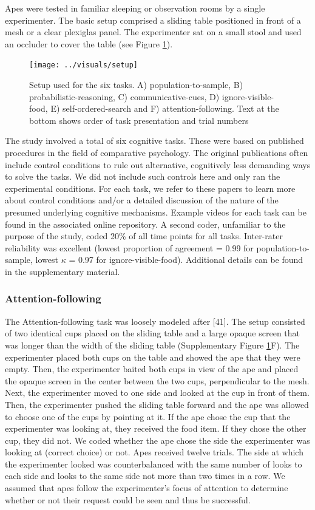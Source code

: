\documentclass[
  man,floatsintext]{apa6}
\begin{document}
Apes were tested in familiar sleeping or observation rooms by a single experimenter. The basic setup comprised a sliding table positioned in front of a mesh or a clear plexiglas panel. The experimenter sat on a small stool and used an occluder to cover the table (see Figure \ref{fig:setup}).

\begin{figure}
\texttt{[image: ../visuals/setup]} \caption{Setup used for the six tasks. A) population-to-sample, B) probabilistic-reasoning, C) communicative-cues, D) ignore-visible-food, E) self-ordered-search and F) attention-following. Text at the bottom shows order of task presentation and trial numbers}\label{fig:setup}
\end{figure}

The study involved a total of six cognitive tasks. These were based on published procedures in the field of comparative psychology. The original publications often include control conditions to rule out alternative, cognitively less demanding ways to solve the tasks. We did not include such controls here and only ran the experimental conditions. For each task, we refer to these papers to learn more about control conditions and/or a detailed discussion of the nature of the presumed underlying cognitive mechanisms. Example videos for each task can be found in the associated online repository. A second coder, unfamiliar to the purpose of the study, coded 20\% of all time points for all tasks. Inter-rater reliability was excellent (lowest proportion of agreement = 0.99 for population-to-sample, lowest \(\kappa\) = 0.97 for ignore-visible-food). Additional details can be found in the supplementary material.

\subsubsection{Attention-following}\label{attention-following}

The Attention-following task was loosely modeled after {[}41{]}. The setup consisted of two identical cups placed on the sliding table and a large opaque screen that was longer than the width of the sliding table (Supplementary Figure \ref{fig:setup}F). The experimenter placed both cups on the table and showed the ape that they were empty. Then, the experimenter baited both cups in view of the ape and placed the opaque screen in the center between the two cups, perpendicular to the mesh. Next, the experimenter moved to one side and looked at the cup in front of them. Then, the experimenter pushed the sliding table forward and the ape was allowed to choose one of the cups by pointing at it. If the ape chose the cup that the experimenter was looking at, they received the food item. If they chose the other cup, they did not. We coded whether the ape chose the side the experimenter was looking at (correct choice) or not. Apes received twelve trials. The side at which the experimenter looked was counterbalanced with the same number of looks to each side and looks to the same side not more than two times in a row. We assumed that apes follow the experimenter's focus of attention to determine whether or not their request could be seen and thus be successful.
\end{document}

